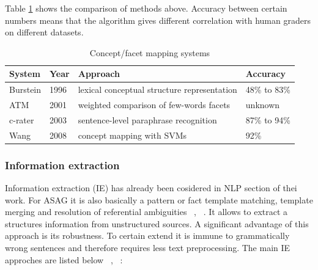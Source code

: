 \documentclass[11pt]{report}
\numberwithin{equation}{section} %
\begin{document}
Table \ref{CFM} shows the comparison of methods above. Accuracy between certain numbers means that the algorithm gives different correlation with human graders on different datasets.

\begin{table}[h!]
\centering
\caption{Concept/facet mapping systems}
\label{CFM}
\begin{tabular}{|l|l|l|l|}
\hline
 System & Year & Approach & Accuracy \\ \hline
 Burstein & 1996 & lexical conceptual structure representation & 48\% to 83\% \\ \hline
 ATM & 2001 & weighted comparison of few-words facets & unknown \\ \hline
 c-rater & 2003 & sentence-level paraphrase recognition & 87\% to 94\% \\ \hline
 Wang & 2008 & concept mapping with SVMs & 92\% \\ \hline
\end{tabular}
\end{table}

\subsubsection{Information extraction}

Information extraction (IE) has already been cosidered in NLP section of thei work. For ASAG it is also basically a pattern or fact template matching, template merging and resolution of referential ambiguities ~\cite{Burrows}, ~\cite{Pulman}. It allows to extract a structures information from unstructured sources. A significant advantage of this approach is its robustness. To certain extend it is immune to grammatically wrong sentences and therefore requires less text preprocessing. The main IE approches are listed below ~\cite{Hasanah}, ~\cite{Pulman}: 
\end{document}

